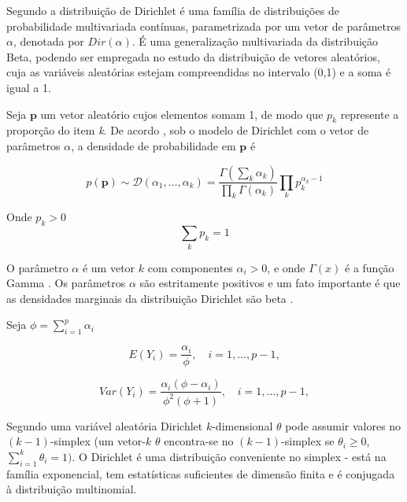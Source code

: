 Segundo  a distribuição de Dirichlet é uma família de distribuições de probabilidade multivariada contínuas, parametrizada por um vetor de parâmetros $\alpha$, denotada por $Dir(\alpha)$. É uma generalização multivariada da distribuição Beta, podendo ser empregada no estudo da distribuição de vetores aleatórios, cuja as variáveis aleatórias estejam compreendidas no intervalo (0,1) e a soma é igual a 1.

Seja $\textbf{p}$ um vetor aleatório cujos elementos somam 1, de modo que $p_{k}$ represente a proporção do item \textit{k}. De acordo \cite{minka2000}, sob o modelo de Dirichlet com o vetor de parâmetros $\alpha$, a densidade de probabilidade em $\textbf{p}$ é


\begin{equation}
p(\boldsymbol {p}) \sim \mathcal{D}(\alpha_{1},\dots,\alpha_{k}) = \frac {\Gamma(\sum_{k} \alpha_{k})}{\prod_{k}\Gamma(\alpha_{k})} \prod_{k} p_{k}^{\alpha_{k}-1}
\end{equation}


Onde $p_{k} > 0$ 
\begin{equation}
\sum_{k} p_{k} = 1
\end{equation}    

O parâmetro $\alpha$ é um vetor $k$ com componentes $\alpha_i > 0$, e onde $\Gamma(x)$ é a função Gamma \cite{blei2003}.
Os parâmetros $\alpha$ são estritamente positivos e um fato importante é que as densidades marginais da distribuição Dirichlet são beta \cite{gomes2005}.

Seja $\phi = \sum_{i=1}^{p} \alpha_i$


\begin{equation}
E(Y_i) = \frac{\alpha_i}{\phi}, \quad i = 1, \dots, p-1,
\end{equation} 

\begin{equation} \label{dir:var}
Var(Y_i) = \frac{\alpha_i(\phi-\alpha_i)}{\phi^2(\phi+1)}, \quad i = 1, \dots, p-1,
\end{equation} 



Segundo \cite{blei2003} uma variável aleatória Dirichlet $k$-dimensional $\theta$ pode assumir valores no $(k-1)$-simplex (um vetor-$k$ $\theta$ encontra-se no $(k-1)$-simplex se $\theta_i \geq 0$,
$\sum_{i=1}^{k} \theta_i =1)$. 
O Dirichlet é uma distribuição conveniente no simplex - está na família exponencial, tem estatísticas suficientes de dimensão finita e é conjugada à distribuição multinomial.


